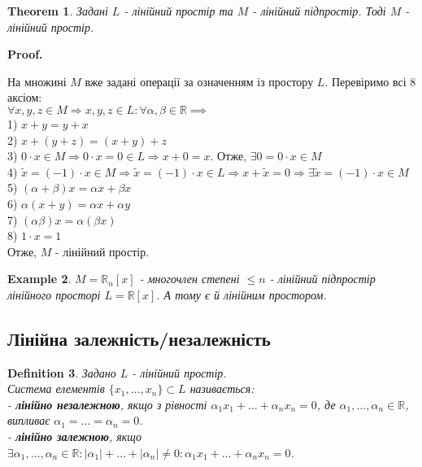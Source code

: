 \documentclass[a4paper, 10pt]{article}
\makeatletter
\theoremstyle{theoremdd}
\newtheorem{theorem}{Theorem}[subsection]
\newtheorem{definition}[theorem]{Definition}
\newtheorem{example}[theorem]{Example}
\renewenvironment{proof}[1][Proof.\\]{\par
\pushQED{\hfill \qed}%
\normalfont \topsep6\p@\@plus6\p@\relax
\trivlist
\item\relax
{\bfseries
#1\@addpunct{.}}\hspace\labelsep\ignorespaces
}{%
\popQED\endtrivlist\@endpefalse
}
\makeatother
\begin{document}
	\begin{theorem}
	Задані $L$ - лінійний простір та $M$ - лінійний підпростір. Тоді $M$ - лінійний простір.
	\end{theorem}
	
	\begin{proof}
	На множині $M$ вже задані операції за означенням із простору $L$. Перевіримо всі 8 аксіом: \\ $\forall x,y,z \in M \Rightarrow x,y,z \in L: \forall \alpha, \beta \in \mathbb{R} \implies$\\
	1) $x+y=y+x$\\
	2) $x+(y+z)=(x+y)+z$\\
	3) $0\cdot x \in M \Rightarrow 0 \cdot x = 0 \in L \Rightarrow x + 0 = x$. Отже, $\exists 0 = 0 \cdot x \in M$\\
	4) $\tilde{x} = (-1)\cdot x \in M \Rightarrow \tilde{x} = (-1)\cdot x \in L \Rightarrow x + \tilde{x} = 0 \Rightarrow \exists \tilde{x} = (-1)\cdot x \in M$\\
	5) $(\alpha + \beta)x = \alpha x + \beta x$\\
	6) $\alpha (x+y)= \alpha x + \alpha y$\\
	7) $(\alpha \beta) x = \alpha (\beta x)$\\
	8) $1 \cdot x = 1$\\
	Отже, $M$ - лінійний простір.
	\end{proof}

	\begin{example}	
		$M = \mathbb{R}_n[x]$ - многочлен степені $\leq n$ - лінійний підпростір лінійного просторі $L = \mathbb{R}[x]$. А тому є й лінійним простором.
	\end{example}
	
	\subsection{Лінійна залежність/незалежність}
	\begin{definition}
	Задано $L$ - лінійний простір.\\
	Система елементів $\{x_1, \dots, x_n\} \subset L$ називається:\\
	- \textbf{лінійно незалежною}, якщо з рівності $\alpha_1 x_1 + \dots + \alpha_n x_n = 0$, де $\alpha_1, \dots, \alpha_n \in \mathbb{R}$, випливає $\alpha_1 = \dots = \alpha_n = 0$.\\
	- \textbf{лінійно залежною}, якщо $\exists \alpha_1, \dots, \alpha_n \in \mathbb{R}: |\alpha_1| + \dots + |\alpha_n| \neq 0: \alpha_1 x_1 + \dots + \alpha_n x_n = 0$.
	\end{definition}
	
\end{document}
